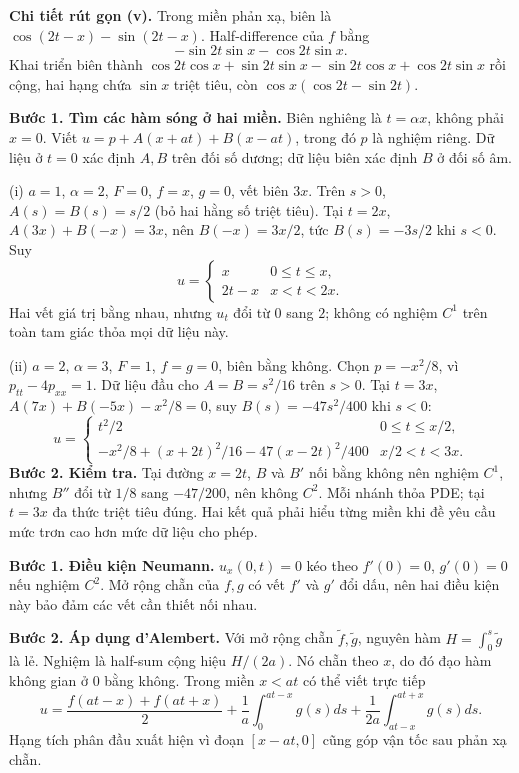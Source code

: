\textbf{Chi tiết rút gọn (v).} Trong miền phản xạ, biên là $\cos(2t-x)-\sin(2t-x)$. Half-difference của $f$ bằng
\[-\sin2t\sin x-\cos2t\sin x.\]
Khai triển biên thành $\cos2t\cos x+\sin2t\sin x-\sin2t\cos x+\cos2t\sin x$ rồi cộng, hai hạng chứa $\sin x$ triệt tiêu, còn $\cos x(\cos2t-\sin2t)$.

\textbf{Bước 1. Tìm các hàm sóng ở hai miền.} Biên nghiêng là $t=\alpha x$, không phải $x=0$. Viết $u=p+A(x+at)+B(x-at)$, trong đó $p$ là nghiệm riêng. Dữ liệu ở $t=0$ xác định $A,B$ trên đối số dương; dữ liệu biên xác định $B$ ở đối số âm.

(i) $a=1$, $\alpha=2$, $F=0$, $f=x$, $g=0$, vết biên $3x$. Trên $s>0$, $A(s)=B(s)=s/2$ (bỏ hai hằng số triệt tiêu). Tại $t=2x$, $A(3x)+B(-x)=3x$, nên $B(-x)=3x/2$, tức $B(s)=-3s/2$ khi $s<0$. Suy
\[u=\begin{cases}x&0\le t\le x,\\2t-x&x<t<2x.\end{cases}\]
Hai vết giá trị bằng nhau, nhưng $u_t$ đổi từ $0$ sang $2$; không có nghiệm $C^1$ trên toàn tam giác thỏa mọi dữ liệu này.

(ii) $a=2$, $\alpha=3$, $F=1$, $f=g=0$, biên bằng không. Chọn $p=-x^2/8$, vì $p_{tt}-4p_{xx}=1$. Dữ liệu đầu cho $A=B=s^2/16$ trên $s>0$. Tại $t=3x$, $A(7x)+B(-5x)-x^2/8=0$, suy $B(s)=-47s^2/400$ khi $s<0$:
\[u=\begin{cases}t^2/2&0\le t\le x/2,\\-x^2/8+(x+2t)^2/16-47(x-2t)^2/400&x/2<t<3x.\end{cases}\]
\textbf{Bước 2. Kiểm tra.} Tại đường $x=2t$, $B$ và $B'$ nối bằng không nên nghiệm $C^1$, nhưng $B''$ đổi từ $1/8$ sang $-47/200$, nên không $C^2$. Mỗi nhánh thỏa PDE; tại $t=3x$ đa thức triệt tiêu đúng. Hai kết quả phải hiểu từng miền khi đề yêu cầu mức trơn cao hơn mức dữ liệu cho phép.

\textbf{Bước 1. Điều kiện Neumann.} $u_x(0,t)=0$ kéo theo $f'(0)=0$, $g'(0)=0$ nếu nghiệm $C^2$. Mở rộng chẵn của $f,g$ có vết $f'$ và $g'$ đổi dấu, nên hai điều kiện này bảo đảm các vết cần thiết nối nhau.

\textbf{Bước 2. Áp dụng d'Alembert.} Với mở rộng chẵn $\widetilde f,\widetilde g$, nguyên hàm $H=\int_0^s\widetilde g$ là lẻ. Nghiệm là half-sum cộng hiệu $H/(2a)$. Nó chẵn theo $x$, do đó đạo hàm không gian ở $0$ bằng không. Trong miền $x<at$ có thể viết trực tiếp
\[u=\frac{f(at-x)+f(at+x)}2+\frac1a\int_0^{at-x}g(s)ds+\frac1{2a}\int_{at-x}^{at+x}g(s)ds.\]
Hạng tích phân đầu xuất hiện vì đoạn $[x-at,0]$ cũng góp vận tốc sau phản xạ chẵn.

